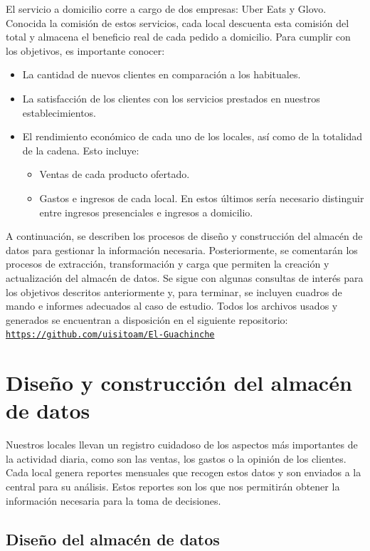 \documentclass[11pt]{opticajnl}
\begin{document}
El servicio a domicilio corre a cargo de dos empresas: Uber Eats y Glovo. Conocida la comisión de estos servicios, cada local descuenta esta comisión del total y almacena el beneficio real de cada pedido a domicilio. Para cumplir con los objetivos, es importante conocer: 
\begin{itemize}
\item La cantidad de nuevos clientes en comparación a los habituales. 
\item La satisfacción de los clientes con los servicios prestados en nuestros establecimientos.
\item El rendimiento económico de cada uno de los locales, así como de la totalidad de la cadena. Esto incluye:
\begin{itemize}
\item Ventas de cada producto ofertado.
\item Gastos e ingresos de cada local. En estos últimos sería necesario distinguir entre ingresos presenciales e ingresos a domicilio. 
\end{itemize}
\end{itemize}

A continuación, se describen los procesos de diseño y construcción del almacén de datos para gestionar la información necesaria. Posteriormente, se comentarán los procesos de extracción, transformación y carga que permiten la creación y actualización del almacén de datos. Se sigue con algunas consultas de interés para los objetivos descritos anteriormente y, para terminar, se incluyen cuadros de mando e informes adecuados al caso de estudio. Todos los archivos usados y generados se encuentran a disposición en el siguiente repositorio: \href{https://github.com/uisitoam/El-Guachinche}{\texttt{https://github.com/uisitoam/El-Guachinche}}

\section{Diseño y construcción del almacén de datos}

Nuestros locales llevan un registro cuidadoso de los aspectos más importantes de la actividad diaria, como son las ventas, los gastos o la opinión de los clientes. Cada local genera reportes mensuales que recogen estos datos y son enviados a la central para su análisis. Estos reportes son los que nos permitirán obtener la información necesaria para la toma de decisiones. 

\subsection{Diseño del almacén de datos}
\end{document}
